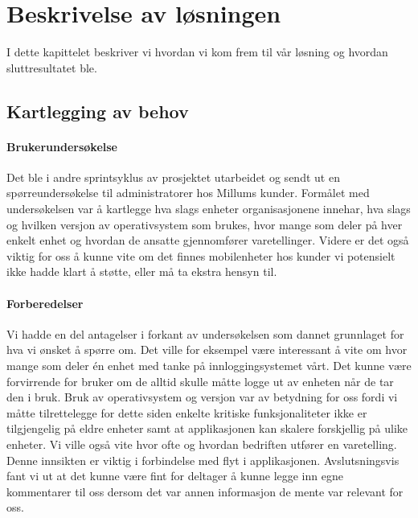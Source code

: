 \chapter{\color{Millum}\textbf{Beskrivelse av løsningen}}
I dette kapittelet beskriver vi hvordan vi kom frem til vår løsning og hvordan sluttresultatet ble. 
 

\section{\textbf{Kartlegging av behov}} \label{Kartlegging_behov}


\subsubsection{\textbf{Brukerundersøkelse}}
Det ble i andre sprintsyklus av prosjektet utarbeidet og sendt ut en spørreundersøkelse til administratorer hos Millums kunder. Formålet med undersøkelsen var å kartlegge hva slags enheter organisasjonene innehar, hva slags og hvilken versjon av operativsystem som brukes, hvor mange som deler på hver enkelt enhet og hvordan de ansatte gjennomfører varetellinger. Videre er det også viktig for oss å kunne vite om det finnes mobilenheter hos kunder vi potensielt ikke hadde klart å støtte, eller må ta ekstra hensyn til. 

\subsubsection{\textbf{Forberedelser}}
Vi hadde en del antagelser i forkant av undersøkelsen som dannet grunnlaget for hva vi ønsket å spørre om. Det ville for eksempel være interessant å vite om hvor mange som deler én enhet med tanke på innloggingsystemet vårt. Det kunne være forvirrende for bruker om de alltid skulle måtte logge ut av enheten når de tar den i bruk. Bruk av operativsystem og versjon var av betydning for oss fordi vi måtte tilrettelegge for dette siden enkelte kritiske funksjonaliteter ikke er tilgjengelig på eldre enheter samt at applikasjonen kan skalere forskjellig på ulike enheter. Vi ville også vite hvor ofte og hvordan bedriften utfører en varetelling. Denne innsikten er viktig i forbindelse med flyt i applikasjonen. Avslutsningsvis fant vi ut at det kunne være fint for deltager å kunne legge inn egne kommentarer til oss dersom det var annen informasjon de mente var relevant for oss.

